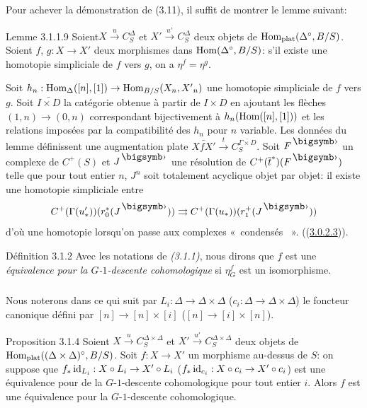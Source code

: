 \documentclass[10pt]{../fichiers-configuration-latex/smfart}
\begin{document}
Pour achever la démonstration de (3.11), il suffit de montrer le lemme
suivant:

\begin{enonce*}{Lemme 3.1.1.9}
Soient\pageoriginale $X \xrightarrow{u} C^{\Delta}_S$ et $X'
\xrightarrow{u'} C^{\Delta}_S$ deux objets de
$\operatorname{Hom}_{\operatorname{plat}}(\Delta^{\circ}, B/S)$. Soient $f$, $g : X \to X'$ deux
morphismes dans $\operatorname{Hom}(\Delta^{\circ}, B/S)$: s'il existe une
homotopie simpliciale de $f$ vers $g$, on a $\eta^f = \eta^g$.
\end{enonce*}

Soit $h_n : \Hom_{\Delta}([n], [1]) \to \Hom_{B/S}(X_n, {X'}_n)$ une
homotopie simpliciale de $f$ vers $g$. Soit $\bar{I \times D}$ la
catégorie obtenue à partir de $I \times D$ en ajoutant les flèches
$(1, n) \to (0, n)$ correspondant bijectivement à $h_n (\operatorname{Hom}([n],
[1]))$ et les relations imposées par la compatibilité des $h_n$ pour
$n$ variable. Les données du lemme définissent une augmentation plate
$\bar{X f X'} \xrightarrow{t} C^{\bar{\Gamma \times D}}_S$. Soit
$F^{\bigdot}$ un complexe de $C^+(S)$ et $J^{\bigdot}$ une résolution de
$C^+(\bar{t}^{\ast})(F^{\bigdot})$ telle que pour tout entier $n$, $J^n$ soit
totalement acyclique objet par objet: il existe une
homotopie simpliciale entre
$$
C^{+} (\Gamma(u'_{\ast})) (r^{\ast}_0(J^{\bigdot})) \rightrightarrows
C^{+} (\Gamma(u_{\ast})) (r^+_1(J^{\bigdot}))
$$
d'où une homotopie lorsqu'on passe aux complexes « condensés  ». (\cf (\hyperref[Vbis.lem3.0.2.3]{3.0.2.3})).

\begin{enonce*}{Définition 3.1.2}
Avec les notations de \emph{(3.1.1)}, nous dirons que $f$ est une
\emph{équivalence pour la $G$-$1$-descente cohomologique} si
$\eta^f_G$ est un isomorphisme.
\end{enonce*}

\setcounter{subsubsection}{2}
\subsubsection{}
Nous noterons dans ce qui suit par $L_i : \Delta \to \Delta
\times \Delta$ (\resp $c_i : \Delta \to \Delta \times
\Delta$) le foncteur canonique défini par $[n] \to [n] \times [i]$
(\resp $[n] \to [i] \times [n]$).

\begin{enonce*}{Proposition 3.1.4}
Soient $X \xrightarrow{u} C^{\Delta \times \Delta}_S$ et $X'
\xrightarrow{u'} C^{\Delta \times \Delta}_S$ deux objets de
$\operatorname{Hom}_{\operatorname{plat}} ((\Delta \times \Delta)^{\circ}, B/S)$. Soit $f : X
\to X'$ un morphisme au-dessus de $S$: on suppose que $f_{\ast}
\id_{L_{i}} : X \circ L_i \to X'\circ L_i$ (\resp $f_{\ast} \id_{c_i} :
X \circ c_i \to X'\circ c_i$) est une équivalence pour de la
$G$-$1$-descente cohomologique pour tout entier $i$. Alors $f$ est une
équivalence pour la $G$-$1$-descente cohomologique.
\end{enonce*}
\end{document}
